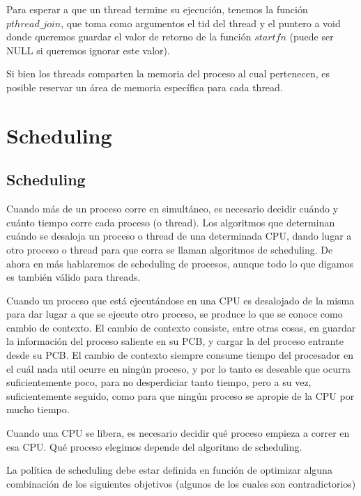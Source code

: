 \documentclass{article}
\begin{document}
Para esperar a que un thread termine su ejecuci\'on, tenemos la funci\'on $pthread\_join$, que toma como argumentos el tid del thread y el puntero a void donde queremos guardar el valor de retorno de la funci\'on $startfn$ (puede ser NULL si queremos ignorar este valor).

Si bien los threads comparten la memoria del proceso al cual pertenecen, es posible reservar un \'area de memoria espec\'ifica para cada thread.

\section{Scheduling}

\subsection{Scheduling}

Cuando m\'as de un proceso corre en simult\'aneo, es necesario decidir cu\'ando y cu\'anto tiempo corre cada proceso (o thread). Los algoritmos que determinan cu\'ando se desaloja un proceso o thread de una determinada CPU, dando lugar a otro proceso o thread para que corra se llaman algoritmos de scheduling. De ahora en m\'as hablaremos de scheduling de procesos, aunque todo lo que digamos es tambi\'en v\'alido para threads.

Cuando un proceso que est\'a ejecut\'andose en una CPU es desalojado de la misma para dar lugar a que se ejecute otro proceso, se produce lo que se conoce como cambio de contexto. El cambio de contexto consiste, entre otras cosas, en guardar la informaci\'on del proceso saliente en su PCB, y cargar la del proceso entrante desde su PCB. El cambio de contexto siempre consume tiempo del procesador en el cu\'al nada util ocurre en ning\'un proceso, y por lo tanto es deseable que ocurra suficientemente poco, para no desperdiciar tanto tiempo, pero a su vez, suficientemente seguido, como para que ning\'un proceso se apropie de la CPU por mucho tiempo.

Cuando una CPU se libera, es necesario decidir qu\'e proceso empieza a correr en esa CPU. Qu\'e proceso elegimos depende del algoritmo de scheduling.

La pol\'itica de scheduling debe estar definida en funci\'on de optimizar alguna combinaci\'on de los siguientes objetivos (algunos de los cuales son contradictorios)
\end{document}
